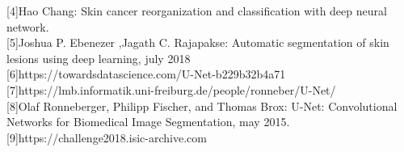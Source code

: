 \documentclass[12pt,a4paper,oneside]{report} %
\begin{document}
[4]Hao Chang: Skin cancer reorganization and classification with deep neural network.\\

[5]Joshua P. Ebenezer ,Jagath C. Rajapakse: Automatic segmentation of skin lesions using deep learning, july 2018\\

[6]https://towardsdatascience.com/U-Net-b229b32b4a71\\

[7]https://lmb.informatik.uni-freiburg.de/people/ronneber/U-Net/\\

[8]Olaf Ronneberger, Philipp Fischer, and Thomas Brox: U-Net: Convolutional Networks for Biomedical Image Segmentation, may 2015.\\

[9]https://challenge2018.isic-archive.com\\


\cleardoublepage
{}
\listoffigures


\end{document}
